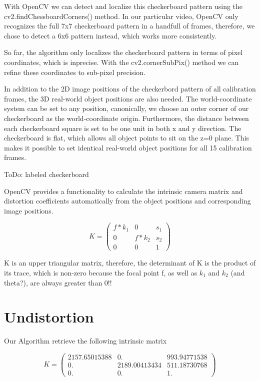 \documentclass[bibliography=totoc]{scrartcl}
\begin{document}
With OpenCV we can detect and localize this checkerboard pattern using the cv2.findChessboardCorners() method.
In our particular video, OpenCV only recognizes the full 7x7 checkerboard pattern in a handfull of frames, 
therefore, we chose to detect a 6x6 pattern instead, which works more consistently.

So far, the algorithm only localizes the checkerboard pattern in terms of pixel coordinates, which is inprecise.
With the cv2.cornerSubPix() method we can refine these coordinates to sub-pixel precision.

In addition to the 2D image positions of the checkerbord pattern of all calibration frames, the 3D real-world object positions are also needed.
The world-coordinate system can be set to any position, canonically, we choose an outer corner of our checkerboard as the world-coordinate origin.
Furthermore, the distance between each checkerboard square is set to be one unit in both x and y direction. 
The checkerboard is flat, which allows all object points to sit on the z=0 plane.
This makes it possible to set identical real-world object positions for all 15 calibration frames.

ToDo: labeled checkerboard

OpenCV provides a functionality to calculate the intrinsic camera matrix and distortion coefficients automatically from the object positions and corresponding image positions.



$$
K =
\begin{pmatrix}
    f * k_1 & 0 & s_1 \\
    0 & f * k_2 & s_2 \\
    0 & 0 & 1
\end{pmatrix}
$$



K is an upper triangular matrix, therefore, the determinant of K is the product of its trace, which is non-zero because the focal point f, as well as $k_1$ and $k_2$ (and theta?), are always greater than 0!!


\section{Undistortion}
Our Algorithm retrieve the following intrinsic matrix

$$
K =
\begin{pmatrix}
    2157.65015388 & 0. & 993.94771538 \\
    0. & 2189.00413434 & 511.18730768 \\
    0. & 0. & 1.
\end{pmatrix}
$$
\end{document}
